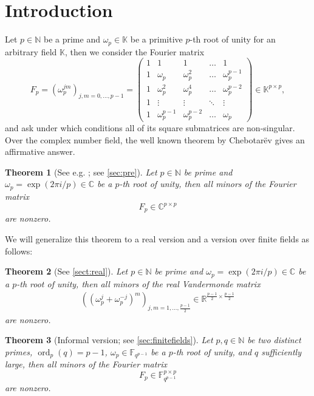 \documentclass[a4paper]{article}
\newcommand{\N}{\ensuremath{\mathbb{N}}}
\renewcommand{\o}{\omega}
\newcommand{\R}{\ensuremath{\mathbb{R}}}
\newcommand{\C}{\ensuremath{\mathbb{C}}}
\newcommand{\K}{\ensuremath{\mathbb{K}}}
\newcommand{\F}{\mathbb{F}}
\newcommand{\ord}{\operatorname{ord}}
\newtheorem{theorem}{Theorem}[]
\numberwithin{equation}{section}
\numberwithin{table}{section}
\numberwithin{figure}{section}
\begin{document}
\section{Introduction}
Let $p \in \N$ be a prime and $\o_p \in \K$ be a primitive $p$-th root of unity for an arbitrary field $\K$, then we consider
the Fourier matrix
\[
F_p=
\left(\omega_p^{jm}\right)_{{j,m=0,\ldots,p-1}}=
\begin{pmatrix}
        1 & 1 & 1 & \ldots & 1\\
        1 & \omega_p & \omega_p^2 & \ldots & \omega_p^{p-1}\\
        1 & \omega_p^2 & \omega_p^4 & \ldots & \omega_p^{p-2} \\
        1 & \vdots& \vdots & \ddots & \vdots \\
        1 & \omega_p^{p-1} & \omega_p^{p-2} & \ldots & \omega_p
    \end{pmatrix} \in \K^{p \times p},
\]
and ask under which conditions all of its square submatrices are non-singular.
Over the complex number field, the well known theorem by Chebotar\"ev gives an affirmative answer.
\begin{theorem}[See e.g. \cite{Evans,Stevenhagen,frenkel,Tao}; see \cref{sec:pre}]\label{Chebotarev}
   Let $p\in\N$ be prime and $\o_p=\exp(2\pi i / p)\in\C$ be a $p$-th root of unity, then
   all minors of the Fourier matrix \[F_p\in\C^{p\times p}\] are nonzero.
\end{theorem}
We will generalize this theorem to a real version and a version over finite fields as follows:
\begin{theorem}[See \cref{sect:real}]\label{th:introReal}
    Let $p\in\N$ be prime and $\o_p=\exp(2\pi i / p)\in\C$ be a $p$-th root of unity, then
    all minors of the real Vandermonde matrix 
    \begin{align*}
        \left(\left(\omega_p^j+\omega_p^{-j}\right)^m\right)_{{j,m=1,\ldots,\frac{p-1}{2}}}
     \in\R^{\frac{p-1}{2}\times\frac{p-1}{2}}   
    \end{align*}
    are nonzero. 
\end{theorem}

\begin{theorem}[Informal version; see \cref{sec:finitefields}]\label{th:introFiniteF}
    Let $p,q\in\N$ be two distinct primes, $\ord_p(q)=p-1$, $\o_p\in\F_{q^{p-1}}$ be a $p$-th root of unity, and $q$ sufficiently large, then all minors of the Fourier matrix \[F_p\in\F_{q^{p-1}}^{p\times p}\]
    are nonzero. 
\end{theorem}
\end{document}
